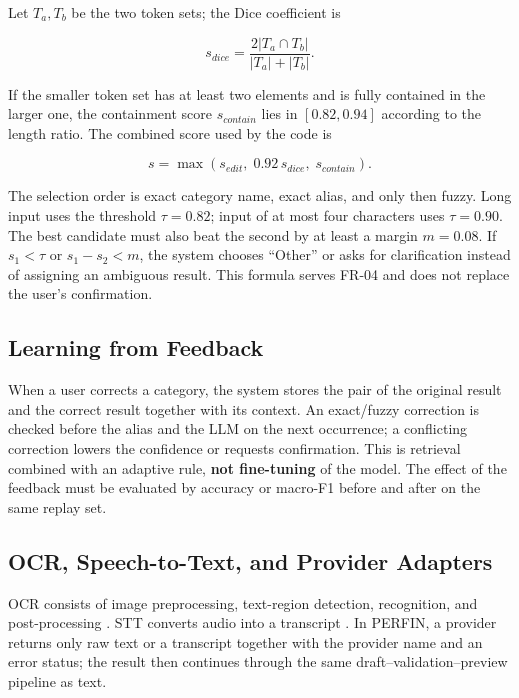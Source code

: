 Let $T_a,T_b$ be the two token sets; the Dice coefficient
\cite{dice1945} is

\begin{equation}
  s_{dice}=\frac{2|T_a\cap T_b|}{|T_a|+|T_b|}.
\end{equation}

If the smaller token set has at least two elements and is fully
contained in the larger one, the containment score $s_{contain}$ lies in
$[0.82, 0.94]$ according to the length ratio. The combined score used by
the code is

\begin{equation}
  s=\max(s_{edit},\;0.92\,s_{dice},\;s_{contain}).
\end{equation}

The selection order is exact category name, exact alias, and only then
fuzzy. Long input uses the threshold $\tau=0.82$; input of at most four
characters uses $\tau=0.90$. The best candidate must also beat the
second by at least a margin $m=0.08$. If $s_1<\tau$ or $s_1-s_2<m$, the
system chooses ``Other'' or asks for clarification instead of assigning
an ambiguous result. This formula serves FR-04 and does not replace the
user's confirmation.

\subsection{Learning from Feedback}

When a user corrects a category, the system stores the pair of the
original result and the correct result together with its context. An
exact/fuzzy correction is checked before the alias and the LLM on the
next occurrence; a conflicting correction lowers the confidence or
requests confirmation. This is retrieval combined with an adaptive rule,
\textbf{not fine-tuning} of the model. The effect of the feedback must
be evaluated by accuracy or macro-F1 before and after on the same replay
set.

\subsection{OCR, Speech-to-Text, and Provider Adapters}

OCR consists of image preprocessing, text-region detection,
recognition, and post-processing \cite{smith2007}. STT converts audio
into a transcript \cite{radford2022}. In PERFIN, a provider returns only
raw text or a transcript together with the provider name and an error
status; the result then continues through the same
draft--validation--preview pipeline as text.

